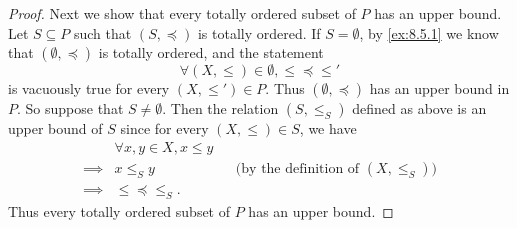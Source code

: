 \begin{proof}
  Next we show that every totally ordered subset of \(P\) has an upper bound.
  Let \(S \subseteq P\) such that \((S, \preceq)\) is totally ordered.
  If \(S = \emptyset\), by \cref{ex:8.5.1} we know that \((\emptyset, \preceq)\) is totally ordered, and the statement
  \[
    \forall (X, \leq) \in \emptyset, \leq \preceq \leq'
  \]
  is vacuously true for every \((X, \leq') \in P\).
  Thus \((\emptyset, \preceq)\) has an upper bound in \(P\).
  So suppose that \(S \neq \emptyset\).
  Then the relation \((S, \leq_S)\) defined as above is an upper bound of \(S\) since for every \((X, \leq) \in S\), we have
  \begin{align*}
             & \forall x, y \in X, x \leq y                                                    \\
    \implies & x \leq_S y                   &  & \text{(by the definition of \((X, \leq_S)\))} \\
    \implies & \leq \preceq \leq_S.
  \end{align*}
  Thus every totally ordered subset of \(P\) has an upper bound.


\end{proof}
